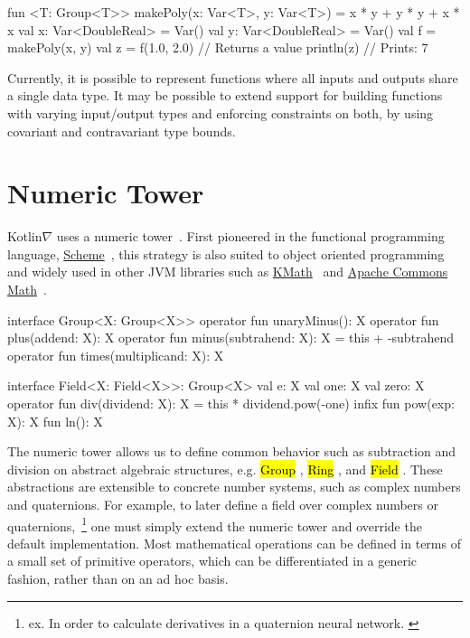 \documentclass[12pt,initial,twoside,maitrise]{dms}
\newcommand{\inline}[1]{%
    \begingroup%
    \sethlcolor{slightgray}%
    \hl{\ttfamily\small #1}%
    \endgroup
}
\numberwithin{equation}{section}
\numberwithin{table}{chapter}
\numberwithin{figure}{chapter}
\begin{document}
\begin{kotlinlisting}
fun <T: Group<T>> makePoly(x: Var<T>, y: Var<T>) = x * y + y * y + x * x
val x: Var<DoubleReal> = Var()
val y: Var<DoubleReal> = Var()
val f = makePoly(x, y)
val z = f(1.0, 2.0) // Returns a value
println(z) // Prints: 7
\end{kotlinlisting}
%
Currently, it is possible to represent functions where all inputs and outputs share a single data type. It may be possible to extend support for building functions with varying input/output types and enforcing constraints on both, by using covariant and contravariant type bounds.

\section{Numeric Tower}\label{sec:numeric-tower}

Kotlin$\nabla$ uses a numeric tower~\citep{st2012typing}. First pioneered in the functional programming language, \href{https://www.gnu.org/software/guile/manual/html_node/Numerical-Tower.html}{Scheme}~\citep{sperber2009revised}, this strategy is also suited to object oriented programming~\citep{niculescu2003design, niculescu2011using} and widely used in other JVM libraries such as \href{https://github.com/mipt-npm/kmath}{KMath}~\citep{nozik2019acat} and \href{https://commons.apache.org/proper/commons-math/}{Apache Commons Math}~\citep{developers2012apache}.

\begin{kotlinlisting}[caption={Most mathematical operations are composed of a small set of simple operators.}]
interface Group<X: Group<X>> {
    operator fun unaryMinus(): X
    operator fun plus(addend: X): X
    operator fun minus(subtrahend: X): X = this + -subtrahend
    operator fun times(multiplicand: X): X
}

interface Field<X: Field<X>>: Group<X> {
    val e: X
    val one: X
    val zero: X
    operator fun div(dividend: X): X = this * dividend.pow(-one)
    infix fun pow(exp: X): X
    fun ln(): X
}
\end{kotlinlisting}
%
The numeric tower allows us to define common behavior such as subtraction and division on abstract algebraic structures, e.g. \inline{Group}, \inline{Ring}, and \inline{Field}. These abstractions are extensible to concrete number systems, such as complex numbers and quaternions. For example, to later define a field over complex numbers or quaternions,~\footnote{ex. In order to calculate derivatives in a quaternion neural network. \citep{isokawa2003quaternion}} one must simply extend the numeric tower and override the default implementation. Most mathematical operations can be defined in terms of a small set of primitive operators, which can be differentiated in a generic fashion, rather than on an ad hoc basis.
\end{document}
